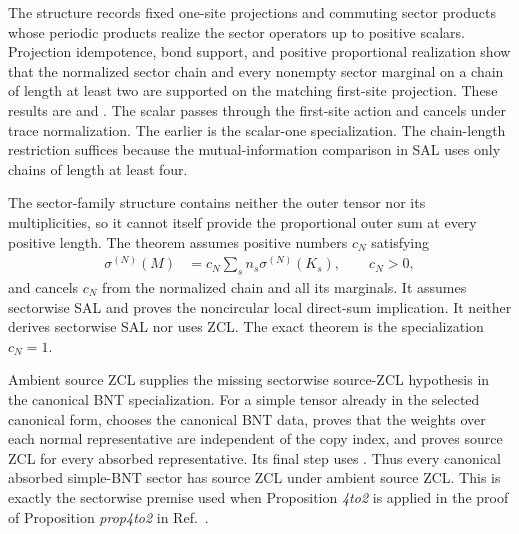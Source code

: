 \documentclass{article}
\begin{document}
The structure
records fixed one-site projections and commuting sector products whose
periodic products realize the sector operators up to positive scalars.
Projection idempotence, bond support, and positive proportional realization
show that the normalized sector chain and every nonempty sector marginal on a
chain of length at least two are supported on the matching first-site
projection. These results are
and
.
The scalar passes through the first-site action and cancels under trace
normalization. The earlier
 is the scalar-one
specialization. The chain-length restriction suffices because the
mutual-information comparison in SAL uses only chains of length at least four.

The sector-family structure contains neither the outer tensor nor its
multiplicities, so it cannot itself provide the proportional outer sum at
every positive length. The theorem
 assumes positive
numbers $c_N$ satisfying
\begin{align}
    \sigma^{(N)}(M)
        &=c_N\sum_s n_s\sigma^{(N)}(K_s),
    \qquad c_N>0,
    \label{eq:cpsv16_commuting_form_to_sal_proportional_orthogonal_outer_sum}
\end{align}
and cancels $c_N$ from the normalized chain and all its marginals. It assumes
sectorwise SAL and proves the noncircular local direct-sum implication. It
neither derives sectorwise SAL nor uses ZCL. The exact theorem
 is the specialization $c_N=1$.

Ambient source ZCL supplies the missing sectorwise source-ZCL hypothesis in
the canonical BNT specialization. For a simple tensor already in the selected
canonical form,
chooses the canonical BNT data, proves that the weights over each normal
representative are independent of the copy index, and proves source ZCL for
every absorbed representative. Its final step uses
.
Thus every canonical absorbed simple-BNT sector has source ZCL under ambient
source ZCL. This is exactly the sectorwise premise used when Proposition
\emph{4to2} is applied in the proof of Proposition \emph{prop4to2} in
Ref.~\cite{Cirac2016MPDO_arXiv}.
\end{document}
